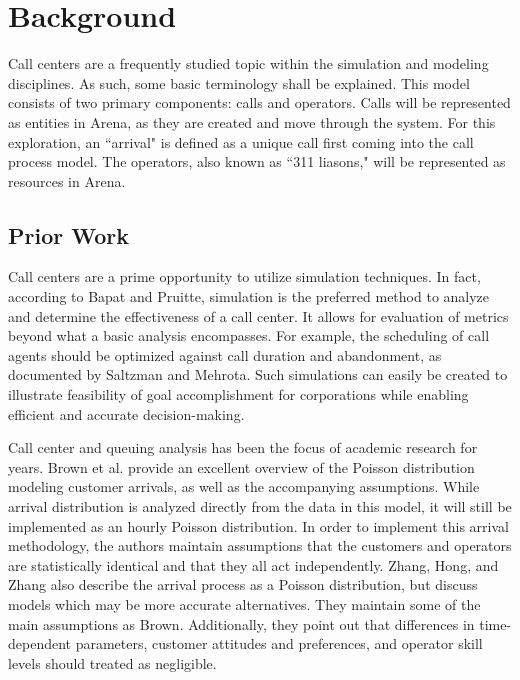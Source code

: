 \documentclass[12pt,twocolumn]{article}
\begin{document}
\section{Background}
Call centers are a frequently studied topic within the simulation and modeling disciplines.  As such, some basic terminology shall be explained.  This model consists of two primary components:  calls and operators.  Calls will be represented as entities in Arena, as they are created and move through the system.  For this exploration, an ``arrival" is defined as a unique call first coming into the call process model.  The operators, also known as ``311 liasons," will be represented as resources in Arena.

	\subsection{Prior Work}

Call centers are a prime opportunity to utilize simulation techniques.  In fact, according to Bapat and Pruitte, simulation is the preferred method to analyze and determine the effectiveness of a call center.\cite{bapat}  It allows for evaluation of metrics beyond what a basic analysis encompasses.  For example, the scheduling of call agents should be optimized against call duration and abandonment, as documented by Saltzman and Mehrota.\cite{saltzman}  Such simulations can easily be created to illustrate feasibility of goal accomplishment for corporations while enabling efficient and accurate decision-making.\cite{saltzmeh}

\par


Call center and queuing analysis has been the focus of academic research for years.  Brown et al. provide an excellent overview of the Poisson distribution modeling customer arrivals, as well as the accompanying assumptions.  While arrival distribution is analyzed directly from the data in this model, it will still be implemented as an hourly Poisson distribution. In order to implement this arrival methodology, the authors maintain assumptions that the customers and operators are statistically identical and that they all act independently.\cite{brown}  Zhang, Hong, and Zhang also describe the arrival process as a Poisson distribution, but discuss models which may be more accurate alternatives.\cite{zhang}  They maintain some of the main assumptions as Brown.  Additionally, they point out that differences in time-dependent parameters, customer attitudes and preferences, and operator skill levels should treated as negligible.
\end{document}
